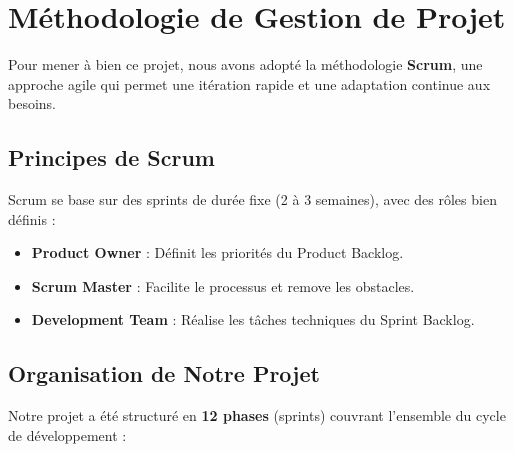 \documentclass[12pt,a4paper]{report}
\begin{document}
\section{Méthodologie de Gestion de Projet}

Pour mener à bien ce projet, nous avons adopté la méthodologie \textbf{Scrum}, une approche agile qui permet une itération rapide et une adaptation continue aux besoins.

\subsection{Principes de Scrum}

Scrum se base sur des sprints de durée fixe (2 à 3 semaines), avec des rôles bien définis :

\begin{itemize}[leftmargin=1.5cm, itemsep=0.3cm]
    \item \textbf{Product Owner} : Définit les priorités du Product Backlog.
    \item \textbf{Scrum Master} : Facilite le processus et remove les obstacles.
    \item \textbf{Development Team} : Réalise les tâches techniques du Sprint Backlog.
\end{itemize}

\subsection{Organisation de Notre Projet}

Notre projet a été structuré en \textbf{12 phases} (sprints) couvrant l'ensemble du cycle de développement :
\end{document}
